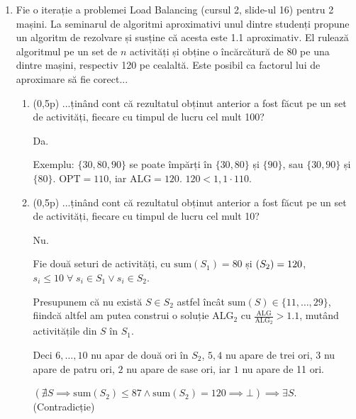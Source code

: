 \documentclass[a4paper,12pt]{article}
\newcommand*{\OPT}{\text{OPT}}
\newcommand*{\ALG}{\text{ALG}}
\begin{document}
\begin{enumerate}

      \item
            Fie o iterație a problemei Load Balancing (cursul 2, slide-ul 16) pentru 2 mașini.
            La seminarul de algoritmi aproximativi unul dintre studenți
            propune un algoritm de rezolvare și susține că acesta este 1.1
            aproximativ. El rulează algoritmul pe un set de $n$ activități și obține o
            încărcătură de 80 pe una dintre mașini, respectiv 120 pe cealaltă. Este
            posibil ca factorul lui de aproximare să fie corect...

            \begin{enumerate}

                  \item (0,5p)
                        ...ținând cont că rezultatul obținut anterior a fost făcut pe un set de
                        activități, fiecare cu timpul de lucru cel mult 100?

                        Da.

                        Exemplu:
                        $\{30, 80, 90\}$ se poate împărți în $\{30, 80\}$ și $\{90\}$, sau $\{30, 90\}$ și $\{80\}$.
                        $\OPT = 110$, iar $\ALG = 120$. $120 < 1,1 \cdot 110$.

                  \item (0,5p)
                        ...ținând cont că rezultatul obținut anterior a fost făcut pe un set de
                        activități, fiecare cu timpul de lucru cel mult 10?

                        Nu.

                        Fie două seturi de activități, cu $\text{sum}(S_1) = 80$ și $\text(S_2) = 120$,
                        $s_i \leq 10 \;\forall\; s_i \in S_1 \lor s_i \in S_2$.

                        Presupunem că nu există $S \in S_2$ astfel încât $\text{sum}(S) \in \{11, \dots, 29\}$,
                        fiindcă altfel am putea construi o soluție $\ALG_2$ cu $\frac{\ALG}{\ALG_2} > 1.1$,
                        mutând activitățile din $S$ în $S_1$.

                        Deci $6, \dots, 10$ nu apar de două ori în $S_2$, $5, 4$ nu apare de trei ori,
                        $3$ nu apare de patru ori, $2$ nu apare de sase ori, iar $1$ nu apare de 11 ori.

                        $\left(\nexists S \implies \text{sum}(S_2) \leq 87 \land \text{sum}(S_2) = 120 \implies \bot\right)
                              \implies \exists S$. (Contradicție)


\end{enumerate}
\end{enumerate}
\end{document}
